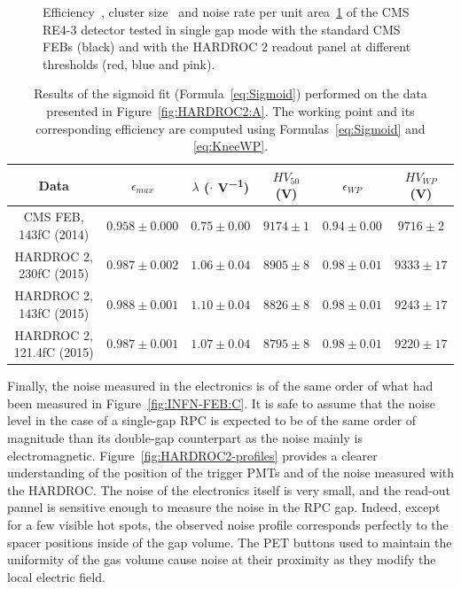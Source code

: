 \begin{figure}[H]
\begin{subfigure}{\linewidth}
			\caption{\label{fig:HARDROC2:C}}
		\end{subfigure}
		\caption{\label{fig:HARDROC2} Efficiency~, cluster size~ and noise rate per unit area~\ref{fig:HARDROC2:C} of the CMS RE4-3 detector tested in single gap mode with the standard CMS FEBs (black) and with the HARDROC 2 readout panel at different thresholds (red, blue and pink).}
	\end{figure}
	
\newpage
	
	\begin{table}[H]
		\caption{\label{tab:HARDROC2} Results of the sigmoid fit (Formula~\ref{eq:Sigmoid}) performed on the data presented in Figure~\ref{fig:HARDROC2:A}. The working point and its corresponding efficiency are computed using Formulas~\ref{eq:Sigmoid} and \ref{eq:KneeWP}.}
		\footnotesize
		\begin{tabular}{|c|c|c|c|c|c|}
			\hline
			Data & $\epsilon_{max}$ & $\lambda$ ($\cdot$\Ord{-2} \si{V^{-1}}) & $HV_{50}$ (\si{V}) & $\epsilon_{WP}$ & $HV_{WP}$ (\si{V}) \\ 
			\hline
			CMS FEB, 143fC (2014) & $0.958 \pm 0.000$ & $0.75 \pm 0.00$ & $9174 \pm 1$ & $0.94 \pm 0.00$ & $9716 \pm 2$\\ 
			\hline
			HARDROC 2, 230fC (2015) & $0.987 \pm 0.002$ & $1.06 \pm 0.04$ & $8905 \pm 8$ & $0.98 \pm 0.01$ & $9333 \pm 17$\\ 
			\hline
			HARDROC 2, 143fC (2015) & $0.988 \pm 0.001$ & $1.10 \pm 0.04$ & $8826 \pm 8$ & $0.98 \pm 0.01$ & $9243 \pm 17$\\ 
			\hline
			HARDROC 2, 121.4fC (2015) & $0.987 \pm 0.001$ & $1.07 \pm 0.04$ & $8795 \pm 8$ & $0.98 \pm 0.01$ & $9220 \pm 17$\\ 
			\hline
		\end{tabular}
	\end{table}
	
	Finally, the noise measured in the electronics is of the same order of what had been measured in Figure~\ref{fig:INFN-FEB:C}. It is safe to assume that the noise level in the case of a single-gap RPC is expected to be of the same order of magnitude than its double-gap counterpart as the noise mainly is electromagnetic. Figure~\ref{fig:HARDROC2-profiles} provides a clearer understanding of the position of the trigger PMTs and of the noise measured with the HARDROC. The noise of the electronics itself is very small, and the read-out pannel is sensitive enough to measure the noise in the RPC gap. Indeed, except for a few visible hot spots, the observed noise profile corresponds perfectly to the spacer positions inside of the gap volume. The PET buttons used to maintain the uniformity of the gas volume cause noise at their proximity as they modify the local electric field.
	 
